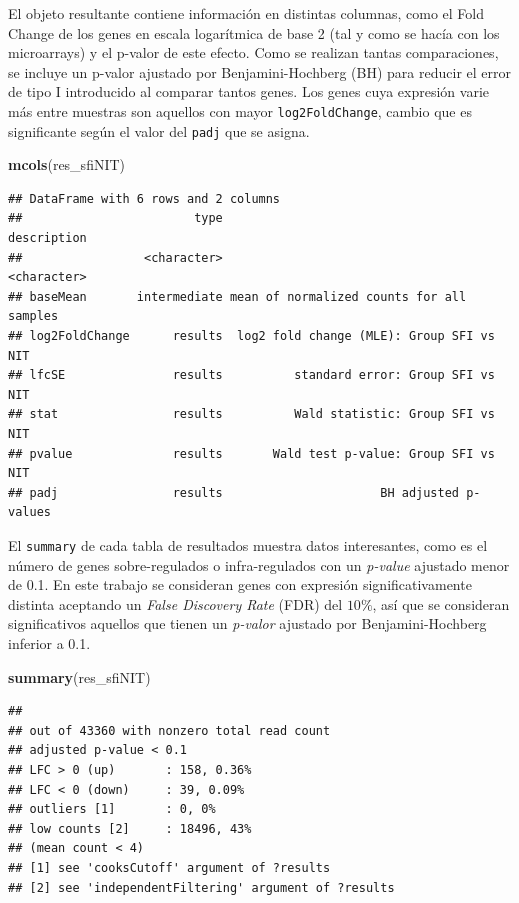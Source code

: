 \documentclass[
]{article}
\newenvironment{Shaded}{\begin{snugshade}}{\end{snugshade}}
\newcommand{\KeywordTok}[1]{\textcolor[rgb]{0.13,0.29,0.53}{\textbf{#1}}}
\newcommand{\NormalTok}[1]{#1}
\begin{document}
El objeto resultante contiene información en distintas columnas, como el
Fold Change de los genes en escala logarítmica de base 2 (tal y como se
hacía con los microarrays) y el p-valor de este efecto. Como se realizan
tantas comparaciones, se incluye un p-valor ajustado por
Benjamini-Hochberg (BH) para reducir el error de tipo I introducido al
comparar tantos genes. Los genes cuya expresión varie más entre muestras
son aquellos con mayor \texttt{log2FoldChange}, cambio que es
significante según el valor del \texttt{padj} que se asigna.

\begin{Shaded}
\begin{Highlighting}[]
\KeywordTok{mcols}\NormalTok{(res_sfiNIT)}
\end{Highlighting}
\end{Shaded}

\begin{verbatim}
## DataFrame with 6 rows and 2 columns
##                        type                               description
##                 <character>                               <character>
## baseMean       intermediate mean of normalized counts for all samples
## log2FoldChange      results  log2 fold change (MLE): Group SFI vs NIT
## lfcSE               results          standard error: Group SFI vs NIT
## stat                results          Wald statistic: Group SFI vs NIT
## pvalue              results       Wald test p-value: Group SFI vs NIT
## padj                results                      BH adjusted p-values
\end{verbatim}

El \texttt{summary} de cada tabla de resultados muestra datos
interesantes, como es el número de genes sobre-regulados o
infra-regulados con un \emph{p-value} ajustado menor de 0.1. En este
trabajo se consideran genes con expresión significativamente distinta
aceptando un \emph{False Discovery Rate} (FDR) del \(10\%\), así que se
consideran significativos aquellos que tienen un \emph{p-valor} ajustado
por Benjamini-Hochberg inferior a 0.1.

\begin{Shaded}
\begin{Highlighting}[]
\KeywordTok{summary}\NormalTok{(res_sfiNIT)}
\end{Highlighting}
\end{Shaded}

\begin{verbatim}
## 
## out of 43360 with nonzero total read count
## adjusted p-value < 0.1
## LFC > 0 (up)       : 158, 0.36%
## LFC < 0 (down)     : 39, 0.09%
## outliers [1]       : 0, 0%
## low counts [2]     : 18496, 43%
## (mean count < 4)
## [1] see 'cooksCutoff' argument of ?results
## [2] see 'independentFiltering' argument of ?results
\end{verbatim}
\end{document}
